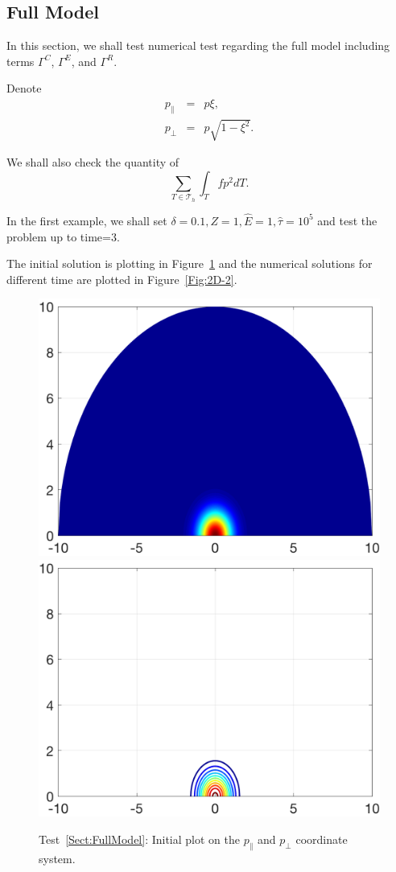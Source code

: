 \documentclass[preprint,11pt]{elsarticle}
\begin{document}
\subsection{Full Model}
In this section, we shall test numerical test regarding the full model including
terms $\Gamma^C$, $\Gamma^E$, and $\Gamma^R$. 

Denote 
\begin{eqnarray*}
p_{\parallel} &=& p\xi,\\
p_{\perp} &=& p\sqrt{1-\xi^2}.
\end{eqnarray*}

We shall also check the quantity of 
$$\sum_{T\in\mathcal{T}_h}\int_T fp^2 dT.$$

In the first example, we shall set
$\delta = 0.1, Z = 1, \hat{E} = 1, \hat{\tau} = 10^5$ and test the problem up to time=3.

The initial solution is plotting in Figure~\ref{Fig:2D-1} and the numerical solutions for different time are plotted in Figure~\ref{Fig:2D-2}.
\begin{figure}[H]
\centering
\includegraphics[width=.48\textwidth]{./NumFig/2D-RE-F0}
\includegraphics[width=.48\textwidth]{./NumFig/2D-RE-F0-contour}
\caption{Test~\ref{Sect:FullModel}: Initial plot on the $p_{\parallel}$ and $p_{\perp}$ coordinate system.}\label{Fig:2D-1}
\end{figure}
\end{document}
